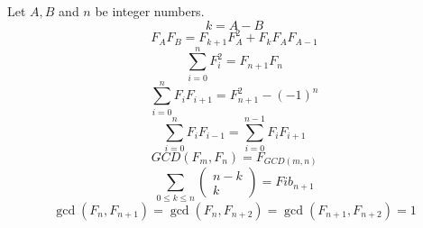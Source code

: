 Let $A, B$ and $n$ be integer numbers.
$$
k=A-B
$$
\begin{equation}
F_A F_B=F_{k+1} F_A^2+F_k F_A F_{A-1}
\end{equation}
\begin{equation}
\sum_{i=0}^n F_i^2=F_{n+1} F_n
\end{equation}
\begin{equation}
\sum_{i=0}^n F_i F_{i+1}=F_{n+1}^2-(-1)^n 
\end{equation}
\begin{equation}
    \sum_{i=0}^n F_i F_{i-1}=\sum_{i=0}^{n-1} F_i F_{i+1}
\end{equation}
\begin{equation}
G C D\left(F_m, F_n\right)=F_{G C D(m, n)}
\end{equation}
\begin{equation}
\sum_{0 \leq k \leq n}\left(\begin{array}{c}
n-k \\
k
\end{array}\right)=F i b_{n+1}
\end{equation}
\begin{equation}
\operatorname{gcd}\left(F_n, F_{n+1}\right)=\operatorname{gcd}\left(F_n, F_{n+2}\right)= \operatorname{gcd}\left(F_{n+1}, F_{n+2}\right)=1
\end{equation}
